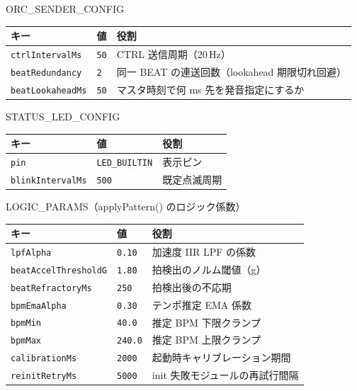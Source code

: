 \documentclass[lualatex,book,paper=a4paper,jafontsize=11.5pt,jafontscale=1.05]{jlreq}
\begin{document}
\begin{apibox}{ORC\_SENDER\_CONFIG}
\begin{tabular}{l l p{}}
\toprule
\textbf{キー} & \textbf{値} & \textbf{役割} \\
\midrule
\texttt{ctrlIntervalMs}  & \texttt{50}  & CTRL 送信周期（20\,Hz） \\
\texttt{beatRedundancy}  & \texttt{2}   & 同一 BEAT の連送回数（lookahead 期限切れ回避） \\
\texttt{beatLookaheadMs} & \texttt{50}  & マスタ時刻で何 ms 先を発音指定にするか \\
\bottomrule
\end{tabular}
\end{apibox}

\begin{apibox}{STATUS\_LED\_CONFIG}
\begin{tabular}{l l p{}}
\toprule
\textbf{キー} & \textbf{値} & \textbf{役割} \\
\midrule
\texttt{pin}             & \texttt{LED\_BUILTIN} & 表示ピン \\
\texttt{blinkIntervalMs} & \texttt{500}          & 既定点滅周期 \\
\bottomrule
\end{tabular}
\end{apibox}

\begin{apibox}{LOGIC\_PARAMS（applyPattern() のロジック係数）}
\begin{tabular}{l l p{}}
\toprule
\textbf{キー} & \textbf{値} & \textbf{役割} \\
\midrule
\texttt{lpfAlpha}            & \texttt{0.10}  & 加速度 IIR LPF の係数 \\
\texttt{beatAccelThresholdG} & \texttt{1.80}  & 拍検出のノルム閾値（g） \\
\texttt{beatRefractoryMs}    & \texttt{250}   & 拍検出後の不応期 \\
\texttt{bpmEmaAlpha}         & \texttt{0.30}  & テンポ推定 EMA 係数 \\
\texttt{bpmMin}              & \texttt{40.0}  & 推定 BPM 下限クランプ \\
\texttt{bpmMax}              & \texttt{240.0} & 推定 BPM 上限クランプ \\
\texttt{calibrationMs}       & \texttt{2000}  & 起動時キャリブレーション期間 \\
\texttt{reinitRetryMs}       & \texttt{5000}  & init 失敗モジュールの再試行間隔 \\
\bottomrule
\end{tabular}
\end{apibox}
\end{document}
